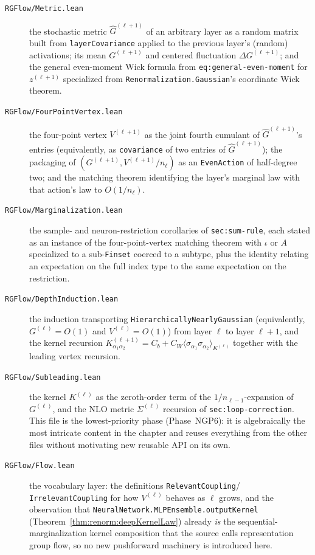 \begin{description}
  \item[\texttt{RGFlow/Metric.lean}] the stochastic metric $\widehat G^{(\ell+1)}$ of an arbitrary
    layer as a random matrix built from \texttt{layerCovariance} applied to the previous layer's
    (random) activations; its mean $G^{(\ell+1)}$ and centered fluctuation $\Delta G^{(\ell+1)}$;
    and the general even-moment Wick formula from \texttt{eq:general-even-moment} for
    $z^{(\ell+1)}$ specialized from \texttt{Renormalization.Gaussian}'s coordinate Wick theorem.
  \item[\texttt{RGFlow/FourPointVertex.lean}] the four-point vertex $V^{(\ell+1)}$ as the joint
    fourth cumulant of $\widehat G^{(\ell+1)}$'s entries (equivalently, as
    \texttt{covariance} of two entries of $\widehat G^{(\ell+1)}$); the packaging of
    $(G^{(\ell+1)},V^{(\ell+1)}/n_\ell)$ as an \texttt{EvenAction} of half-degree two; and the
    matching theorem identifying the layer's marginal law with that action's law to $O(1/n_\ell)$.
  \item[\texttt{RGFlow/Marginalization.lean}] the sample- and neuron-restriction corollaries of
    \texttt{sec:sum-rule}, each stated as an instance of the four-point-vertex matching theorem with
    $\iota$ or $A$ specialized to a sub-\texttt{Finset} coerced to a subtype, plus the identity
    relating an expectation on the full index type to the same expectation on the restriction.
  \item[\texttt{RGFlow/DepthInduction.lean}] the induction transporting
    \texttt{HierarchicallyNearlyGaussian} (equivalently, $G^{(\ell)}=O(1)$ and $V^{(\ell)}=O(1)$)
    from layer $\ell$ to layer $\ell+1$, and the kernel recursion
    $K^{(\ell+1)}_{\alpha_1\alpha_2}=C_b+C_W\langle\sigma_{\alpha_1}\sigma_{\alpha_2}\rangle_{K^{(\ell)}}$
    together with the leading vertex recursion.
  \item[\texttt{RGFlow/Subleading.lean}] the kernel $K^{(\ell)}$ as the zeroth-order term of the
    $1/n_{\ell-1}$-expansion of $G^{(\ell)}$, and the NLO metric $\Sigma^{(\ell)}$ recursion of
    \texttt{sec:loop-correction}. This file is the lowest-priority phase (Phase~NGP6): it is
    algebraically the most intricate content in the chapter and reuses everything from the other
    files without motivating new reusable API on its own.
  \item[\texttt{RGFlow/Flow.lean}] the vocabulary layer: the definitions \texttt{RelevantCoupling}/
    \texttt{IrrelevantCoupling} for how $V^{(\ell)}$ behaves as $\ell$ grows, and the observation
    that \texttt{NeuralNetwork.MLPEnsemble.outputKernel}
    (Theorem~\ref{thm:renorm:deepKernelLaw}) already \emph{is} the sequential-marginalization
    kernel composition that the source calls representation group flow, so no new pushforward
    machinery is introduced here.
\end{description}


